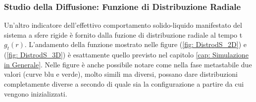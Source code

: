 \documentclass[11pt]{article}
\theoremstyle{plain}
\theoremstyle{remark}
\begin{document}
\FloatBarrier 
\subsubsection{Studio della Diffusione: Funzione di Distribuzione Radiale}
Un'altro indicatore dell'effettivo comportamento solido-liquido manifestato del sistema a sfere rigide è fornito dalla fuzione di distribuzione radiale al tempo t $g_t(r)$.
\newline
L'andamento della funzione mostrato nelle figure (\ref{fig: DistrodS_2D}) e (\ref{fig: DistrodS_3D}) è esattamente quello previsto nel capitolo \ref{cap: Simulazione in Generale}.
\newline
Nelle figure è anche possibile notare come nella fase metastabile due valori (curve blu e verde), molto simili ma diversi, possano dare distribuzioni completamente diverse a secondo di quale sia la configurazione a partire da cui vengono inizializzati.
\end{document}
